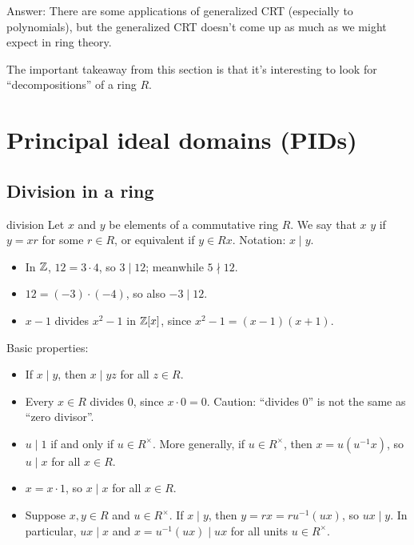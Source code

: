 \documentclass[12pt,letterpaper]{report}
\begin{document}
Answer: There are some applications of generalized CRT (especially to polynomials), but the
generalized CRT doesn't come up as much as we might expect in ring theory.

The important takeaway from this section is that it's interesting to look for ``decompositions'' of
a ring $R$.


\section{Principal ideal domains (PIDs)}

\subsection{Division in a ring}

\begin{defn}{division}{}
  Let $x$ and $y$ be elements of a commutative ring $R$.
  We say that $x$  $y$ if $y = xr$ for some $r \in R$, or equivalent if $y \in Rx$.
  Notation: $x \mid y$.
\end{defn}

\begin{ex}
  \begin{itemize}
    \item In $\mathbb{Z}$, $12 = 3 \cdot 4$, so $3 \mid 12$; meanwhile $5 \nmid 12$.
    \item $12 = (-3) \cdot (-4)$, so also $-3 \mid 12$.
    \item $x - 1$ divides $x^2 - 1$ in $\mathbb{Z}[x]$, since $x^2 - 1 = (x - 1)(x + 1)$.
  \end{itemize}
\end{ex}

Basic properties:
\begin{itemize}
  \item If $x \mid y$, then $x \mid yz$ for all $z \in R$.
  \item Every $x \in R$ divides 0, since $x \cdot 0 = 0$.
    Caution: ``divides 0'' is not the same as ``zero divisor''.
  \item $u \mid 1$ if and only if $u \in R^\times$.
    More generally, if $u \in R^\times$, then $x = u(u^{-1}x)$, so $u \mid x$ for all $x \in R$.
  \item $x = x \cdot 1$, so $x \mid x$ for all $x \in R$.
  \item Suppose $x, y \in R$ and $u \in R^\times$.
    If $x \mid y$, then $y = rx = ru^{-1}(ux)$, so $ux \mid y$.
    In particular, $ux \mid x$ and $x = u^{-1}(ux) \mid ux$ for all units $u \in R^\times$.
\end{itemize}
\end{document}

